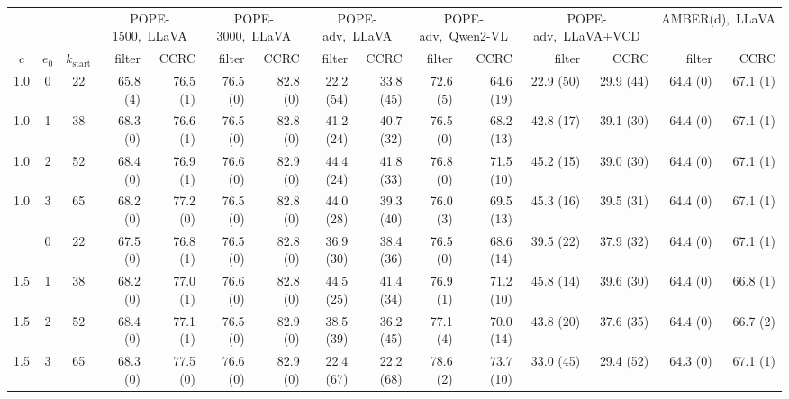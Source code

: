 \begin{tabular}{cccrrrrrrrrrrrr}
\toprule
 & & & \multicolumn{2}{c}{POPE-1500,~LLaVA} & \multicolumn{2}{c}{POPE-3000,~LLaVA} & \multicolumn{2}{c}{POPE-adv,~LLaVA} & \multicolumn{2}{c}{POPE-adv,~Qwen2-VL} & \multicolumn{2}{c}{POPE-adv,~LLaVA+VCD} & \multicolumn{2}{c}{AMBER(d),~LLaVA}\\
\cmidrule(lr){4-5}\cmidrule(lr){6-7}\cmidrule(lr){8-9}\cmidrule(lr){10-11}\cmidrule(lr){12-13}\cmidrule(lr){14-15}
$c$ & $e_0$ & $k_{\mathrm{start}}$ & filter & CCRC & filter & CCRC & filter & CCRC & filter & CCRC & filter & CCRC & filter & CCRC\\
\midrule
1.0 & 0 & 22 & 65.8 (4) & 76.5 (1) & 76.5 (0) & 82.8 (0) & 22.2 (54) & 33.8 (45) & 72.6 (5) & 64.6 (19) & 22.9 (50) & 29.9 (44) & 64.4 (0) & 67.1 (1)\\
1.0 & 1 & 38 & 68.3 (0) & 76.6 (1) & 76.5 (0) & 82.8 (0) & 41.2 (24) & 40.7 (32) & 76.5 (0) & 68.2 (13) & 42.8 (17) & 39.1 (30) & 64.4 (0) & 67.1 (1)\\
1.0 & 2 & 52 & 68.4 (0) & 76.9 (1) & 76.6 (0) & 82.9 (0) & 44.4 (24) & 41.8 (33) & 76.8 (0) & 71.5 (10) & 45.2 (15) & 39.0 (30) & 64.4 (0) & 67.1 (1)\\
1.0 & 3 & 65 & 68.2 (0) & 77.2 (0) & 76.5 (0) & 82.8 (0) & 44.0 (28) & 39.3 (40) & 76.0 (3) & 69.5 (13) & 45.3 (16) & 39.5 (31) & 64.4 (0) & 67.1 (1)\\
\addlinespace
1.5 & 0 & 22 & 67.5 (0) & 76.8 (1) & 76.5 (0) & 82.8 (0) & 36.9 (30) & 38.4 (36) & 76.5 (0) & 68.6 (14) & 39.5 (22) & 37.9 (32) & 64.4 (0) & 67.1 (1)\\
1.5 & 1 & 38 & 68.2 (0) & 77.0 (1) & 76.6 (0) & 82.8 (0) & 44.5 (25) & 41.4 (34) & 76.9 (1) & 71.2 (10) & 45.8 (14) & 39.6 (30) & 64.4 (0) & 66.8 (1)\\
1.5 & 2 & 52 & 68.4 (0) & 77.1 (1) & 76.5 (0) & 82.9 (0) & 38.5 (39) & 36.2 (45) & 77.1 (4) & 70.0 (14) & 43.8 (20) & 37.6 (35) & 64.4 (0) & 66.7 (2)\\
1.5 & 3 & 65 & 68.3 (0) & 77.5 (0) & 76.6 (0) & 82.9 (0) & 22.4 (67) & 22.2 (68) & 78.6 (2) & 73.7 (10) & 33.0 (45) & 29.4 (52) & 64.3 (0) & 67.1 (1)\\
\bottomrule
\end{tabular}
